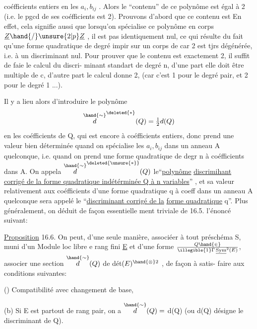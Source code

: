 
coéfficients entiers en les $a_i,b_{ij}$ . Alors le ``contenu'' de ce polynôme
est égal à 2 (i.e. le pgcd de ses coéfficients est 2).
 Prouvons d'abord que ce contenu est 
En effet, cela signifie aussi que  lorsqu'on spécialise ce polynôme
en  corps $\underline{Z}\hand{/}\unsure{2|p}\underline{Z}$\hand{)} , il est pas identiquement nul, ce qui 
résulte du fait qu'une forme quadratique de degré impir sur un corps de
car 2 est tjrs dégénérée, i.e. à un discriminant nul. Pour prouver
que le contenu  est exactement 2, il suffit de faie le calcul du discri-%
minant  standart de degré n, d'une part elle doit être multiple de c,
d'autre part le calcul donne 2, (car c'est 1 pour le degré pair, et 2 pour
le degré 1 ...).

 Il y a lieu alors d'introduire le polynôme
\[ \overset{\hand{\sim}}{d}^{\deleted{*}}(Q) = \tfrac{1}{2}d(Q) \]
en les coéfficients de Q, qui est encore à coéfficients entiers, donc
prend une valeur bien déterminée quand on spécialise les $a_i,b_{ij}$ dans un
anneau A quelconque, i.e. quand on prend une forme quadratique  de degr
n à coéfficients dans A. On appela $\overset{\hand{\sim}}{d}^{\deleted{\unsure{*}}}(Q)$ le``\uline{polynôme} \uline{discrimihant}
\uline{corrigé de la forme quadratique indétérminée Q à n variables}'' , et sa
valeur relativement aux coéfficients d'une forme quadratique q à coeff
dans un anneau A quelconque sera appelé le ``\uline{discriminant corrigé de la}
\uline{forme quadratique} q''. Plus généralement, on déduit de façon essentielle
ment triviale de 16.5. l'énoncé suivant:

\uline{Proposition} 16.6. On peut,  d'une seule manière, associéer à tout
préschéma S, muni d'un Module loc libre e rang fini \uline{E} et d'une forme 
$Q \hand{\in}\over{\illegible{1}}{\Gamma}\,\underline{\mathrm{Sym}}^2(E)$, associer une section $\overset{\hand{\sim}}{d}(Q)$ de dét$(E)^{\hand{\otimes}2}$ , de façon à satis-%
faire aux conditions suivantes:

() Compatibilité avec changement de base,

(b) Si E est partout de rang pair, on a $\overset{\hand{\sim}}{d}(Q) =$ d(Q) (ou d(Q)
désigne le discriminant de Q).

